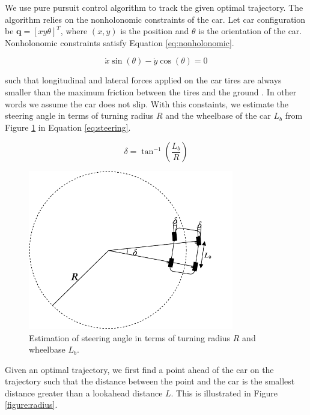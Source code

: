 We use pure pursuit control algorithm to track the given optimal trajectory.
The algorithm relies on the nonholonomic constraints of the car. Let car
configuration be $\textbf{q} = [x y \theta]^T$, where $(x, y)$ is the position
and $\theta$ is the orientation of the car. Nonholonomic constraints satisfy
Equation \eqref{eq:nonholonomic}.

\begin{equation}
    \dot{x}\sin(\theta) - \dot{y}\cos(\theta) = 0
\label{eq:nonholonomic}
\end{equation}

such that longitudinal and lateral forces applied on the car tires are always
smaller than the maximum friction between the tires and the ground \cite{cite18}.
In other words we assume the car does not slip. With this constaints, we
estimate the steering angle in terms of turning radius $R$ and the wheelbase of
the car $L_b$ from Figure \ref{figure:steering} in Equation
\eqref{eq:steering}.

\begin{equation}
    \delta = \tan^{-1}(\frac{L_b}{R})
\label{eq:steering}
\end{equation}

\begin{figure}[h]
  \centering
  \includegraphics[width=0.8\textwidth]{figures/pure-pursuit-steering.pdf}
  \caption{Estimation of steering angle in terms of turning radius $R$ and
  wheelbase $L_b$.}
  \label{figure:steering}
\end{figure}

Given an optimal trajectory, we first find a point ahead of the car on the
trajectory such that the distance between the point and the car is the smallest
distance greater than a lookahead distance $L$. This is illustrated in Figure
\ref{figure:radius}.

